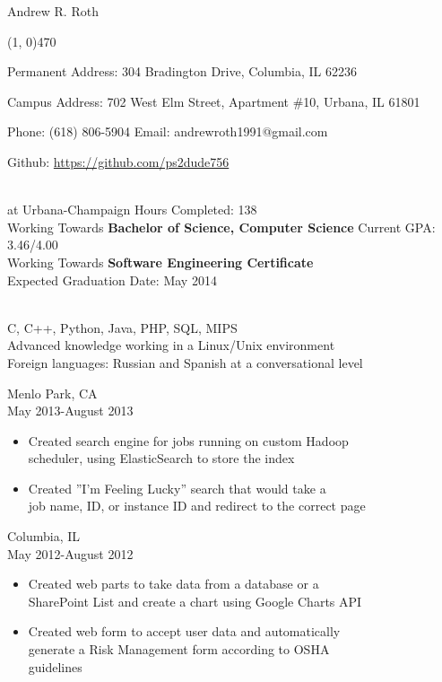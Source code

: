 \documentclass[11pt]{article}
\begin{document}
  \centerline{{\Huge \sc Andrew R. Roth}}
  \noindent\line(1, 0){470}\\
  \centerline{
    Permanent Address:
      304 Bradington Drive,
      Columbia,
      IL 62236
  }
  \centerline{
    Campus Address:
      702 West Elm Street,
      Apartment \#10,
      Urbana,
      IL 61801
  }
  \centerline{
    Phone: (618) 806-5904
    \indent Email: andrewroth1991@gmail.com
  }
  \centerline{
    Github: \url{https://github.com/ps2dude756}
  }

  \bigskip

  \\
     at Urbana-Champaign \hfill 
      Hours Completed: 138\\
    \indent Working Towards {\bf Bachelor of Science, Computer Science} \hfill 
      Current GPA: 3.46/4.00\\
    \indent Working Towards {\bf Software Engineering Certificate}\\
    \indent Expected Graduation Date: May 2014

  \bigskip

  \\
    \indent C, C++, Python, Java, PHP, SQL, MIPS\\
    \indent Advanced knowledge working in a Linux/Unix environment\\
    \indent Foreign languages: Russian and Spanish at a conversational level

  \bigskip

    \smallskip

     \hfill Menlo Park, CA\\
     \hfill May 2013-August 2013
    \begin{itemize}[noitemsep,topsep=0pt,leftmargin=52pt]
      \item Created search engine for jobs running on custom Hadoop\\
        scheduler, using ElasticSearch to store the index
      \item Created ''I'm Feeling Lucky'' search that would take a\\
        job name, ID, or instance ID and redirect to the correct page
    \end{itemize}
    \medskip

     \hfill Columbia, IL\\
     \hfill May 2012-August 2012
    \begin{itemize}[noitemsep,topsep=0pt,leftmargin=52pt]
      \item Created web parts to take data from a database or a\\
        SharePoint List and create a chart using Google Charts API
      \item Created web form to accept user data and automatically\\
        generate a Risk Management form according to OSHA\\
        guidelines
    \end{itemize}
    \medskip
\end{document}
